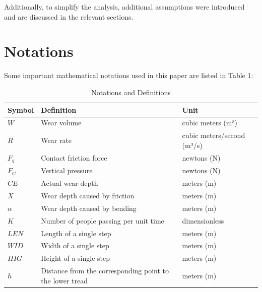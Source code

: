 \documentclass{mcmthesis}
\begin{document}
Additionally, to simplify the analysis, additional assumptions were introduced and are discussed in the relevant sections.
\section{Notations}%

Some important mathematical notations used in this paper are listed in Table 1:

\begin{table}[h!]
  \centering
  \caption{Notations and Definitions}
  \begin{tabular}{@{}lll@{}}
  \toprule
  \textbf{Symbol} & \textbf{Definition}                          & \textbf{Unit}              \\ \midrule
  \(W\)              & Wear volume                                  & cubic meters (m³)          \\
  \(R\)               & Wear rate                                    & cubic meters/second (m³/s) \\
  \(F_q\)              & Contact friction force                      & newtons (N)                \\
  \(F_G\)              & Vertical pressure                           & newtons (N)                \\
  \(CE\)              & Actual wear depth                           & meters (m)                 \\
  \(X\)               & Wear depth caused by friction               & meters (m)                 \\
  $\alpha $               & Wear depth caused by bending                & meters (m)                 \\
  \(K\)               & Number of people passing per unit time      & dimensionless              \\
  \(LEN\)             & Length of a single step                     & meters (m)                 \\
  \(WID\)             & Width of a single step                      & meters (m)                 \\
  \(HIG\)             & Height of a single step                     & meters (m)                 \\
  \(h\)               & Distance from the corresponding point to the lower tread    & meters (m)                 \\ \bottomrule
  \end{tabular}
  \end{table}
\end{document}
